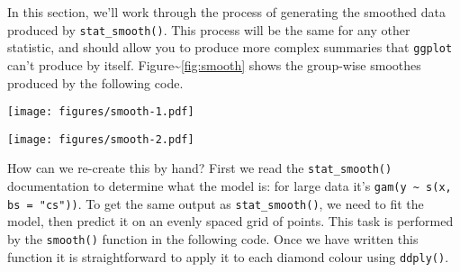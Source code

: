 In this section, we'll work through the process of generating the
smoothed data produced by \texttt{stat\_smooth()}. This process will be
the same for any other statistic, and should allow you to produce more
complex summaries that \texttt{ggplot} can't produce by itself.
Figure\textasciitilde{}\ref{fig:smooth} shows the group-wise smoothes
produced by the following code. 

\begin{Shaded}
\begin{Highlighting}[]
  \NormalTok{, }
   
\end{Highlighting}
\end{Shaded}

\texttt{[image: figures/smooth-1.pdf]}

\begin{Shaded}
\begin{Highlighting}[]
\StringTok{ }\StringTok{ }\NormalTok{)}
  \NormalTok{, }
    \NormalTok{)}
\end{Highlighting}
\end{Shaded}

\texttt{[image: figures/smooth-2.pdf]}

How can we re-create this by hand? First we read the
\texttt{stat\_smooth()} documentation to determine what the model is:
for large data it's \texttt{gam(y \textasciitilde{} s(x, bs = "cs"))}.
To get the same output as \texttt{stat\_smooth()}, we need to fit the
model, then predict it on an evenly spaced grid of points. This task is
performed by the \texttt{smooth()} function in the following code. Once
we have written this function it is straightforward to apply it to each
diamond colour using \texttt{ddply()}. 

